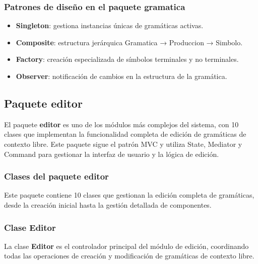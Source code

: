 \subsubsection{Patrones de diseño en el paquete gramatica}

\begin{itemize}
    \item \textbf{Singleton}: gestiona instancias únicas de gramáticas activas.
    \item \textbf{Composite}: estructura jerárquica Gramatica → Produccion → Simbolo.
    \item \textbf{Factory}: creación especializada de símbolos terminales y no terminales.
    \item \textbf{Observer}: notificación de cambios en la estructura de la gramática.
\end{itemize}


\subsection{Paquete editor}

El paquete \textbf{editor} es uno de los módulos más complejos del sistema, con 10 clases que implementan la funcionalidad completa de edición de gramáticas de contexto libre. Este paquete sigue el patrón MVC y utiliza State, Mediator y Command para gestionar la interfaz de usuario y la lógica de edición.

\subsubsection{Clases del paquete editor}

Este paquete contiene 10 clases que gestionan la edición completa de gramáticas, desde la creación inicial hasta la gestión detallada de componentes.

\subsubsection{Clase Editor}

La clase \textbf{Editor} es el controlador principal del módulo de edición, coordinando todas las operaciones de creación y modificación de gramáticas de contexto libre.

